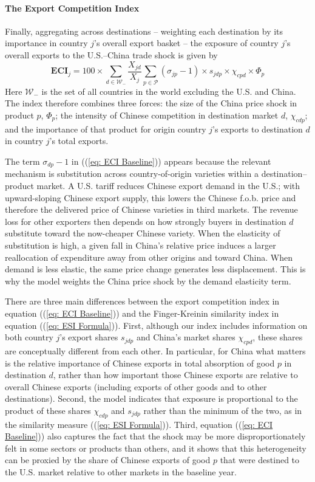 \documentclass[english,12pt]{article}
\theoremstyle{definition}
\let\oldref\ref
\renewcommand{\ref}[1]{(\oldref{#1})}
\begin{document}
\paragraph{The Export Competition Index}
Finally, aggregating across destinations -- weighting each destination 
by its importance in country $j$'s overall export basket -- the exposure 
of country $j$'s overall exports to the U.S.--China trade shock is 
given by
\begin{equation}
 \boldsymbol{ECI}_{j}=100\times\sum_{d\in\mathcal{W}_{-}}\frac{X_{jd}}{X_{j}}\sum_{p\in\mathcal{P}}\left(\sigma_{jp}-1\right)\times s_{jdp}\times\chi_{cpd}\times \Phi_{p}
\label{eq: ECI Baseline}
\end{equation}
Here $\mathcal{W}_{-}$ is the set of all countries in the world excluding the U.S. and China. The index therefore combines three forces: the size of the China price shock in product $p$, $\Phi_{p}$; the intensity of Chinese competition in destination market $d$, $\chi_{cdp}$; and the importance of that product for origin country $j$'s exports to destination $d$ in country $j$'s total exports.


The term $\sigma_{dp}-1$ in (\ref{eq: ECI Baseline}) appears because the relevant mechanism is substitution across country-of-origin varieties within a destination--product market. A U.S. tariff reduces Chinese export demand in the U.S.; with upward-sloping Chinese export supply, this lowers the Chinese f.o.b. price and therefore the delivered price of Chinese varieties in third markets. The revenue loss for other exporters then depends on how strongly buyers in destination $d$ substitute toward the now-cheaper Chinese variety. When the elasticity of substitution is high, a given fall in China's relative price induces a larger reallocation of expenditure away from other origins and toward China. When demand is less elastic, the same price change generates less displacement. This is why the model weights the China price shock by the demand elasticity term.

There are three main differences between the export competition index in
equation (\ref{eq: ECI Baseline}) and the Finger-Kreinin similarity index in
equation (\ref{eq: ESI Formula}). First, although our index includes
information on both country $j$'s export shares $s_{jdp}$ and China's market
shares $\chi _{cpd}$, these shares are conceptually different from each
other. In particular, for China what matters is the relative importance of
Chinese exports in total absorption of good $p$ in destination $d$, rather
than how important those Chinese exports are relative to overall Chinese
exports (including exports of other goods and to other destinations).
Second, the model indicates that exposure is proportional to the product of
these shares $\chi _{cdp}$ and $s_{jdp}$ rather than the minimum of the two,
as in the similarity measure (\ref{eq: ESI Formula}). Third, equation (\ref%
{eq: ECI Baseline}) also captures the fact that the shock may be more
disproportionately felt in some sectors or products than others, and it
shows that this heterogeneity can be proxied by the share of Chinese exports
of good $p$ that were destined to the U.S. market relative to other markets
in the baseline year.
\end{document}

